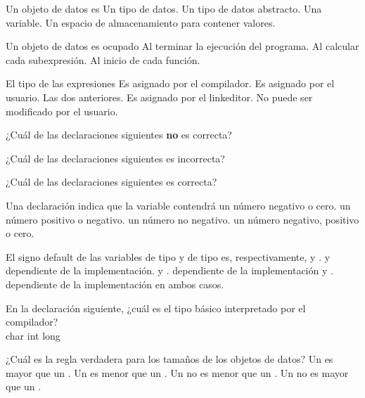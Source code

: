 
\begin{preguntas}
\label{sec:tc-tipos-preg}
\question Un objeto de datos es
\choice Un tipo de datos.
\choice Un tipo de datos abstracto.
\choice Una variable.
\correctchoice Un espacio de almacenamiento para contener valores.

\question Un objeto de datos es ocupado
\choice Al terminar la ejecución del programa.
\correctchoice Al calcular cada subexpresión.
\choice Al inicio de cada función.

\question El tipo de las expresiones
\choice Es asignado por el compilador.
\choice Es asignado por el usuario.
\correctchoice Las dos anteriores.
\choice Es asignado por el linkeditor.
\choice No puede ser modificado por el usuario.

\question ¿Cuál de las declaraciones siguientes \textbf{no} es correcta?
\choice {}
\choice {}
\correctchoice {}
\choice {}
\choice {}

\question ¿Cuál de las declaraciones siguientes es incorrecta?
\choice {}
\choice {}
\correctchoice {}
\choice {}

\question ¿Cuál de las declaraciones siguientes es correcta?
\correctchoice {}
\choice {}
\choice {}
\choice {}

\question Una declaración  indica que la variable contendrá
\choice un número negativo o cero.
\choice un número positivo o negativo.
\choice un número no negativo.
\correctchoice un número negativo, positivo o cero.

\question El signo default de las variables de tipo  y de tipo  es, respectivamente,
\choice {} y .
\correctchoice {} y dependiente de la implementación.
\choice {} y .
\choice dependiente de la implementación y .
\choice dependiente de la implementación en ambos casos.

\question En la declaración siguiente, ¿cuál es el tipo básico interpretado por el compilador? \\
\choice char
\correctchoice int
\choice long

\question ¿Cuál es la regla verdadera para los tamaños de los objetos de datos?
\choice Un  es mayor que un .
\choice Un  es menor que un .
\choice Un  no es menor que un .
\correctchoice Un  no es mayor que un .


\end{preguntas}
